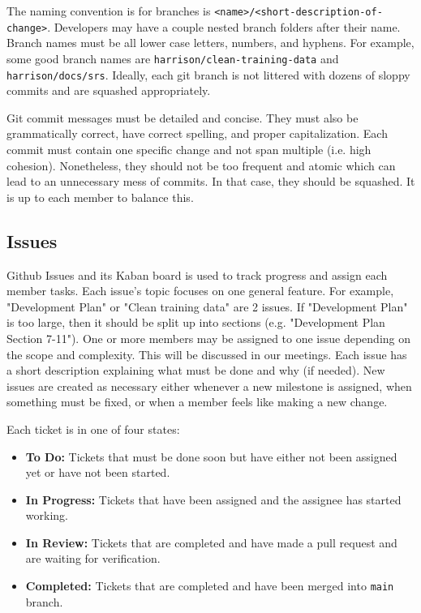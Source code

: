 \documentclass{article}
\begin{document}
The naming convention is for branches is \verb|<name>/<short-description-of-change>|. 
Developers may have a couple nested branch folders after their name. Branch names must be all 
lower case letters, numbers, and hyphens. For example, some good branch names are 
\verb|harrison/clean-training-data| and \verb|harrison/docs/srs|. Ideally, each git branch is not 
littered with dozens of sloppy commits and are squashed appropriately.

Git commit messages must be detailed and concise. They must also be grammatically correct, have
correct spelling, and proper capitalization. Each commit must contain one specific change and not 
span multiple (i.e. high cohesion). Nonetheless, they should not be too frequent and atomic which
can lead to an unnecessary mess of commits. In that case, they should be squashed. It is up to 
each member to balance this.

\subsection{Issues}
Github Issues and its Kaban board is used to track progress and assign each member tasks. Each 
issue's topic focuses on one general feature. For example, "Development Plan" or "Clean training 
data" are 2 issues. If "Development Plan" is too large, then it should be split up into sections
(e.g. "Development Plan Section 7-11"). One or more members may be assigned to one issue depending 
on the scope and complexity. This will be discussed in our meetings. Each issue has a short 
description explaining what must be done and why (if needed). New issues are created as necessary
either whenever a new milestone is assigned, when something must be fixed, or when a member
feels like making a new change.

Each ticket is in one of four states:
\begin{itemize}
  \item \textbf{To Do:} Tickets that must be done soon but have either not been assigned yet or have not been started.
  \item \textbf{In Progress:} Tickets that have been assigned and the assignee has started working.
  \item \textbf{In Review:} Tickets that are completed and have made a pull request and are waiting for verification.
  \item \textbf{Completed:} Tickets that are completed and have been merged into \verb|main| branch.
\end{itemize}
\end{document}
